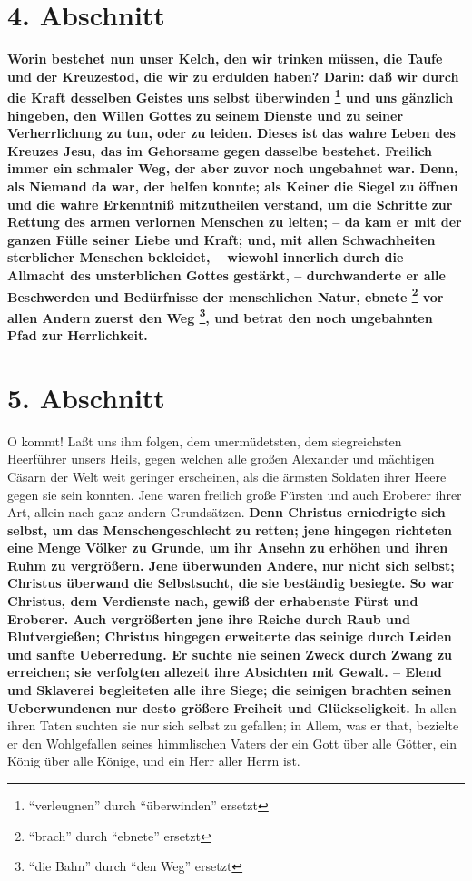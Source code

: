 \section{4. Abschnitt} \label{kap4_ab4}

 
\textbf{Worin bestehet nun unser Kelch, den wir trinken müssen, die Taufe und
der
Kreuzestod, die wir zu erdulden haben? Darin: daß wir durch die Kraft desselben
Geistes uns selbst überwinden \footnote{"`verleugnen"' durch "`überwinden"'
ersetzt} und uns gänzlich hingeben, den Willen Gottes zu
seinem Dienste und zu seiner Verherrlichung zu tun, oder zu leiden. Dieses ist
das wahre Leben des Kreuzes Jesu, das im Gehorsame gegen dasselbe bestehet.
Freilich immer ein schmaler Weg, der aber zuvor noch ungebahnet war. Denn, als
Niemand da war, der helfen konnte; als Keiner die Siegel  zu
öffnen und die wahre
Erkenntniß mitzutheilen verstand, um die Schritte zur Rettung des armen
verlornen Menschen zu leiten; -- da kam er mit der ganzen Fülle seiner Liebe und
Kraft; und, mit allen Schwachheiten sterblicher Menschen bekleidet, -- wiewohl
innerlich durch die Allmacht  des unsterblichen Gottes
gestärkt, -- durchwanderte
er alle Beschwerden und Bedürfnisse der menschlichen Natur, ebnete
\footnote{"`brach"' durch "`ebnete"' ersetzt} vor allen
Andern zuerst den Weg \footnote{"`die Bahn"' durch "`den Weg"' ersetzt}, und
betrat den noch ungebahnten Pfad zur Herrlichkeit.}

\section{5. Abschnitt} \label{kap4_ab5}

O kommt! Laßt uns ihm folgen, dem unermüdetsten, dem siegreichsten Heerführer
unsers Heils, gegen welchen alle großen Alexander 
und mächtigen Cäsarn der Welt 
weit geringer erscheinen, als die ärmsten Soldaten ihrer Heere
 gegen sie sein
konnten. Jene waren freilich große Fürsten und auch Eroberer
 ihrer Art, allein
nach ganz andern Grundsätzen. \textbf{Denn Christus erniedrigte sich selbst, um
das
Menschengeschlecht zu retten; jene hingegen richteten eine Menge Völker zu
Grunde, um ihr Ansehn zu erhöhen und ihren Ruhm zu vergrößern. Jene überwunden
Andere, nur nicht sich selbst; Christus überwand die Selbstsucht, die sie
beständig besiegte. So war Christus, dem Verdienste nach, gewiß der erhabenste
Fürst und Eroberer. Auch vergrößerten jene ihre Reiche durch Raub und
Blutvergießen; Christus hingegen erweiterte das seinige durch Leiden und sanfte
Ueberredung. Er suchte nie seinen Zweck durch Zwang zu erreichen; sie verfolgten
allezeit ihre Absichten mit Gewalt. -- Elend und Sklaverei begleiteten alle ihre
Siege; die seinigen brachten seinen Ueberwundenen nur desto größere Freiheit und
Glückseligkeit.} In allen ihren Taten suchten sie nur sich selbst zu gefallen;
in Allem, was er that, bezielte er den Wohlgefallen seines himmlischen Vaters
der ein Gott über alle Götter, ein König über alle Könige, und ein Herr aller
Herrn ist.

